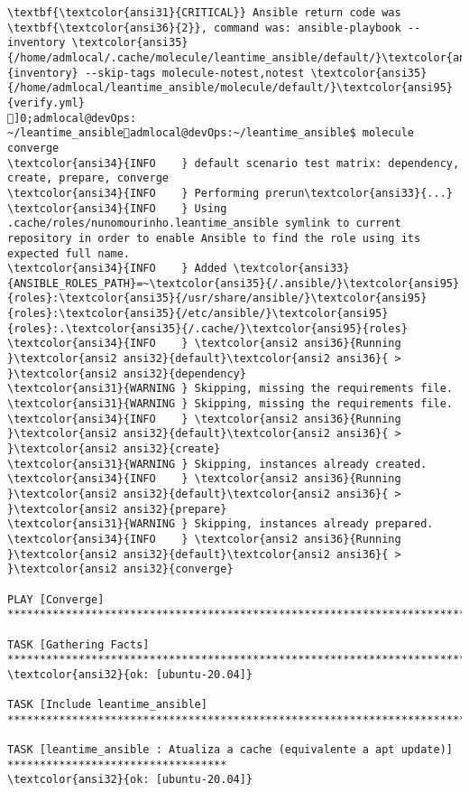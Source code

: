 \documentclass{scrartcl}
\begin{document}
\begin{Verbatim}
\textbf{\textcolor{ansi31}{CRITICAL}} Ansible return code was \textbf{\textcolor{ansi36}{2}}, command was: ansible-playbook --inventory \textcolor{ansi35}{/home/admlocal/.cache/molecule/leantime_ansible/default/}\textcolor{ansi95}{inventory} --skip-tags molecule-notest,notest \textcolor{ansi35}{/home/admlocal/leantime_ansible/molecule/default/}\textcolor{ansi95}{verify.yml}
]0;admlocal@devOps: ~/leantime_ansibleadmlocal@devOps:~/leantime_ansible$ molecule converge
\textcolor{ansi34}{INFO    } default scenario test matrix: dependency, create, prepare, converge
\textcolor{ansi34}{INFO    } Performing prerun\textcolor{ansi33}{...}
\textcolor{ansi34}{INFO    } Using .cache/roles/nunomourinho.leantime_ansible symlink to current repository in order to enable Ansible to find the role using its expected full name.
\textcolor{ansi34}{INFO    } Added \textcolor{ansi33}{ANSIBLE_ROLES_PATH}=~\textcolor{ansi35}{/.ansible/}\textcolor{ansi95}{roles}:\textcolor{ansi35}{/usr/share/ansible/}\textcolor{ansi95}{roles}:\textcolor{ansi35}{/etc/ansible/}\textcolor{ansi95}{roles}:.\textcolor{ansi35}{/.cache/}\textcolor{ansi95}{roles}
\textcolor{ansi34}{INFO    } \textcolor{ansi2 ansi36}{Running }\textcolor{ansi2 ansi32}{default}\textcolor{ansi2 ansi36}{ > }\textcolor{ansi2 ansi32}{dependency}
\textcolor{ansi31}{WARNING } Skipping, missing the requirements file.
\textcolor{ansi31}{WARNING } Skipping, missing the requirements file.
\textcolor{ansi34}{INFO    } \textcolor{ansi2 ansi36}{Running }\textcolor{ansi2 ansi32}{default}\textcolor{ansi2 ansi36}{ > }\textcolor{ansi2 ansi32}{create}
\textcolor{ansi31}{WARNING } Skipping, instances already created.
\textcolor{ansi34}{INFO    } \textcolor{ansi2 ansi36}{Running }\textcolor{ansi2 ansi32}{default}\textcolor{ansi2 ansi36}{ > }\textcolor{ansi2 ansi32}{prepare}
\textcolor{ansi31}{WARNING } Skipping, instances already prepared.
\textcolor{ansi34}{INFO    } \textcolor{ansi2 ansi36}{Running }\textcolor{ansi2 ansi32}{default}\textcolor{ansi2 ansi36}{ > }\textcolor{ansi2 ansi32}{converge}

PLAY [Converge] ****************************************************************************************

TASK [Gathering Facts] *********************************************************************************
\textcolor{ansi32}{ok: [ubuntu-20.04]}

TASK [Include leantime_ansible] ************************************************************************

TASK [leantime_ansible : Atualiza a cache (equivalente a apt update)] **********************************
\textcolor{ansi32}{ok: [ubuntu-20.04]}


\end{Verbatim}
\end{document}

